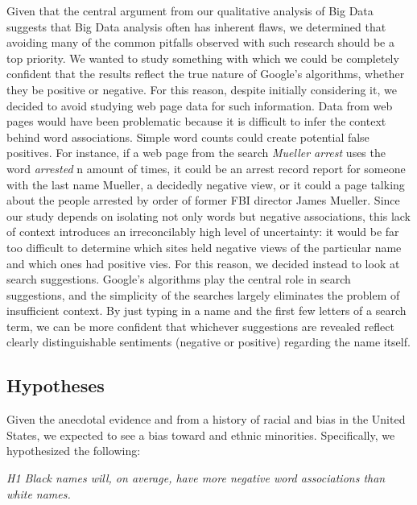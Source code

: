 \documentclass[sigconf]{acmart}
\begin{document}
Given that the central argument from our qualitative analysis of Big Data suggests that Big Data analysis often has inherent flaws, we determined that avoiding many of the common pitfalls observed with such research should be a top priority. We wanted to study something with which we could be completely confident that the results reflect the true nature of Google's algorithms, whether they be positive or negative. For this reason, despite initially considering it, we decided to avoid studying web page data for such information. Data from web pages would have been problematic because it is difficult to infer the context behind word associations. Simple word counts could create potential false positives. For instance, if a web page from the search {\em Mueller arrest} uses the word {\em arrested} n amount of times, it could be an arrest record report for someone with the last name Mueller, a decidedly negative view, or it could a page talking about the people arrested by order of former FBI director James Mueller. Since our study depends on isolating not only words but negative associations, this lack of context introduces an irreconcilably high level of uncertainty: it would be far too difficult to determine which sites held negative views of the particular name and which ones had positive vies. For this reason, we decided instead to look at search suggestions. Google's algorithms play the central role in search suggestions, and the simplicity of the searches largely eliminates the problem of insufficient context. By just typing in a name and the first few letters of a search term, we can be more confident that whichever suggestions are revealed reflect clearly distinguishable sentiments (negative or positive) regarding the name itself.

\subsection{Hypotheses}

Given the anecdotal evidence and from a history of racial and bias in the United States, we expected to see a bias toward and ethnic minorities. Specifically, we hypothesized the following: \\

\vspace{2mm}

{\em H1 Black names will, on average, have more negative word associations than white names.} \\

\vspace{2mm}
\end{document}
